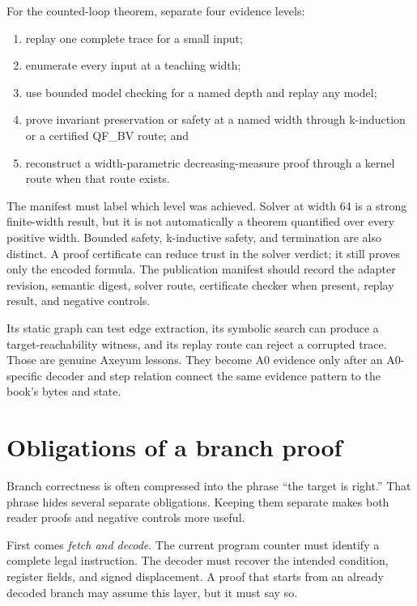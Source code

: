 For the counted-loop theorem, separate four evidence levels:

\begin{enumerate}
\item replay one complete trace for a small input;
\item enumerate every input at a teaching width;
\item use bounded model checking for a named depth and replay any model;
\item prove invariant preservation or safety at a named width through
k-induction or a certified QF\_BV route; and
\item reconstruct a width-parametric decreasing-measure proof through a
kernel route when that route exists.
\end{enumerate}

The manifest must label which level was achieved. Solver  at
width 64 is a strong finite-width result, but it is not automatically a theorem
quantified over every positive width. Bounded safety, k-inductive safety, and
termination are also distinct. A proof certificate can reduce trust in the
solver verdict; it still proves only the encoded formula. The publication
manifest should record the adapter revision, semantic digest, solver route,
certificate checker when present, replay result, and negative controls.

\begin{sidebar}[title={What the existing toy VM can teach immediately}]
Its static graph can test edge extraction, its symbolic search can produce a
target-reachability witness, and its replay route can reject a corrupted
trace. Those are genuine Axeyum lessons. They become A0 evidence only after an
A0-specific decoder and step relation connect the same evidence pattern to the
book's bytes and state.
\end{sidebar}

\section{Obligations of a branch proof}

Branch correctness is often compressed into the phrase ``the target is
right.'' That phrase hides several separate obligations. Keeping them separate
makes both reader proofs and negative controls more useful.

First comes \emph{fetch and decode}. The current program counter must identify
a complete legal instruction. The decoder must recover the intended condition,
register fields, and signed displacement. A proof that starts from an already
decoded branch may assume this layer, but it must say so.

